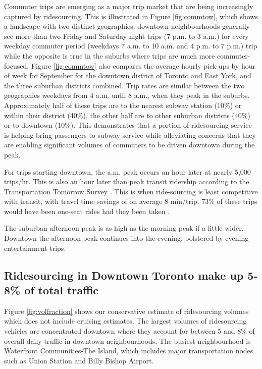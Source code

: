 \documentclass[]{trbunofficial_bdit_final}
\begin{document}
Commuter trips are emerging as a major trip market that are being increasingly
captured by ridesourcing. This is illustrated in Figure \ref{fig:commtow},
which shows a landscape with two distinct geographies: downtown neighbourhoods
generally see more than two Friday and Saturday night trips (7 p.m. to 3 a.m.)
for every weekday commuter period (weekdays 7 a.m. to 10 a.m. and 4 p.m. to 7
p.m.) trip while the opposite is true in the suburbs where trips are much more
commuter-focused. Figure \ref{fig:commtow} also compares the average hourly
pick-ups by hour of week for September for the downtown district of Toronto and
East York, and the three suburban districts combined. Trip rates are similar
between the two geographies weekdays from 4 a.m. until 8 a.m., when they peak
in the suburbs. Approximately half of these trips are to the nearest subway
station (10\%) or within their district (40\%), the other half are to other
suburban districts (40\%) or to downtown (10\%). This demonstrates that a portion
of ridesourcing service is helping bring passengers to subway service while
alleviating concerns that they are enabling significant volumes of commuters to
be driven downtown during the peak.

For trips starting downtown, the a.m. peak occurs an hour later at nearly 5,000
trips/hr. This is also an hour later than peak transit ridership according to
the Transportation Tomorrow Survey \cite{wenting2019transitcharacteristics}.
This is when ride-sourcing is least competitive with transit, with travel time
savings of on average 8 min/trip. 73\% of these trips would have been one-seat
rides had they been taken \cite{wenting2019transitcharacteristics}.

The suburban afternoon peak is as high as the morning peak if a little wider.
Downtown the afternoon peak continues into the evening, bolstered by evening
entertainment trips.

\hypertarget{ridesourcing-in-downtown-toronto-make-up-5-8-of-total-traffic}{%
\subsection{Ridesourcing in Downtown Toronto make up 5-8\% of total traffic}\label{ridesourcing-in-downtown-toronto-make-up-5-8-of-total-traffic}}

Figure \ref{fig:volfraction} shows our conservative estimate of ridesourcing
volumes which does not include cruising estimates. The largest volumes of
ridesourcing vehicles are concentrated downtown where they account for
between 5 and 8\% of overall daily traffic in downtown neighbourhoods. The
busiest neighbourhood is Waterfront Communities-The Island, which includes major
transportation nodes such as Union Station and Billy Bishop Airport.
\end{document}
